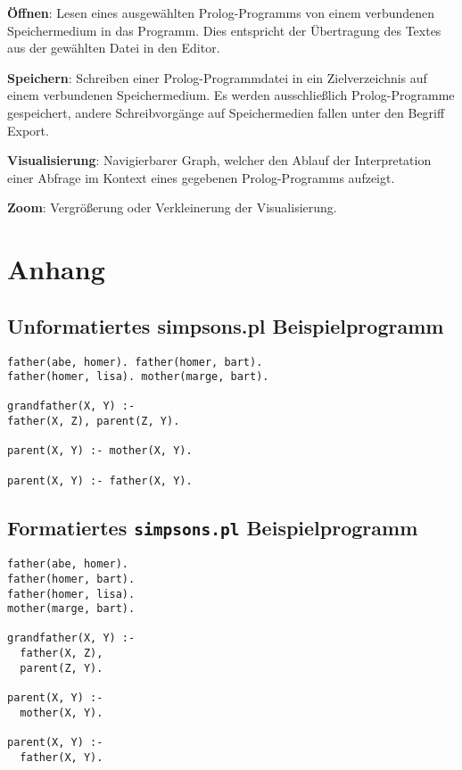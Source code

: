 \documentclass[parskip=full,11pt,twoside]{scrartcl}
\begin{document}
\textbf{Öffnen}:
Lesen eines ausgewählten Prolog-Programms von einem verbundenen Speichermedium in das Programm. Dies entspricht der Übertragung des Textes aus der gewählten Datei in den Editor.

\textbf{Speichern}:
Schreiben einer Prolog-Programmdatei in ein Zielverzeichnis auf einem verbundenen Speichermedium. Es werden ausschließlich Prolog-Programme gespeichert, andere Schreibvorgänge auf Speichermedien fallen unter den Begriff Export.

\textbf{Visualisierung}:
Navigierbarer Graph, welcher den Ablauf der Interpretation einer Abfrage im Kontext eines gegebenen Prolog-Programms aufzeigt.

\textbf{Zoom}:
Vergrößerung oder Verkleinerung der Visualisierung.

\newpage
\section{Anhang}
\label{appendix:simpsons}

\subsection{Unformatiertes simpsons.pl Beispielprogramm}

\begin{lstlisting}
father(abe, homer). father(homer, bart).
father(homer, lisa). mother(marge, bart).

grandfather(X, Y) :-
father(X, Z), parent(Z, Y).

parent(X, Y) :- mother(X, Y).

parent(X, Y) :- father(X, Y).
\end{lstlisting}

\subsection{Formatiertes \texttt{simpsons.pl} Beispielprogramm}

\begin{lstlisting}
father(abe, homer).
father(homer, bart).
father(homer, lisa).
mother(marge, bart).

grandfather(X, Y) :-
  father(X, Z),
  parent(Z, Y).

parent(X, Y) :-
  mother(X, Y).

parent(X, Y) :-
  father(X, Y).
\end{lstlisting}
\end{document}
